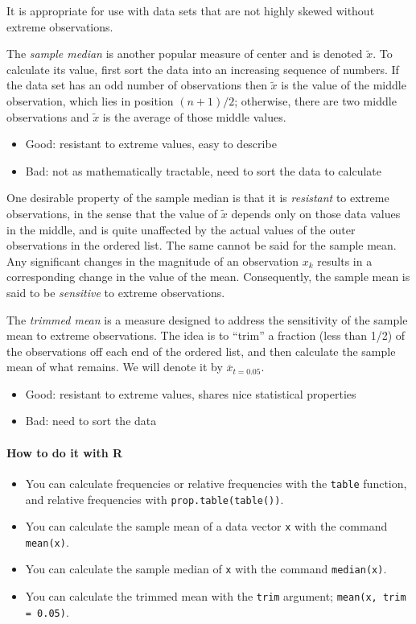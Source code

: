 \documentclass[captions=tableheading]{scrbook}
\begin{document}
It is appropriate for use with data sets that are not highly skewed without extreme observations.

The \emph{sample median} is another popular measure of center and is denoted \(\tilde{x}\). To calculate its value, first sort the data into an increasing sequence of numbers. If the data set has an odd number of observations then \(\tilde{x}\) is the value of the middle observation, which lies in position \((n+1)/2\); otherwise, there are two middle observations and \(\tilde{x}\) is the average of those middle values.

\begin{itemize}
\item Good: resistant to extreme values, easy to describe
\item Bad: not as mathematically tractable, need to sort the data to calculate
\end{itemize}

One desirable property of the sample median is that it is \emph{resistant} to extreme observations, in the sense that the value of \(\tilde{x}\) depends only on those data values in the middle, and is quite unaffected by the actual values of the outer observations in the ordered list. The same cannot be said for the sample mean. Any significant changes in the magnitude of an observation \(x_{k}\) results in a corresponding change in the value of the mean. Consequently, the sample mean is said to be \emph{sensitive} to extreme observations.

The \emph{trimmed mean} is a measure designed to address the sensitivity of the sample mean to extreme observations. The idea is to ``trim'' a fraction (less than 1/2) of the observations off each end of the ordered list, and then calculate the sample mean of what remains. We will denote it by \(\overline{x}_{t=0.05}\).

\begin{itemize}
\item Good: resistant to extreme values, shares nice statistical properties
\item Bad: need to sort the data
\end{itemize}


\paragraph*{How to do it with \textsf{R}}

\begin{itemize}
\item You can calculate frequencies or relative frequencies with the \texttt{table} function, and relative frequencies with \texttt{prop.table(table())}. \item You can calculate the sample mean of a data vector \texttt{x} with the command \texttt{mean(x)}.
\item You can calculate the sample median of \texttt{x} with the command \texttt{median(x)}. \item You can calculate the trimmed mean with the \texttt{trim} argument; \texttt{mean(x, trim = 0.05)}.
\end{itemize}
\end{document}
